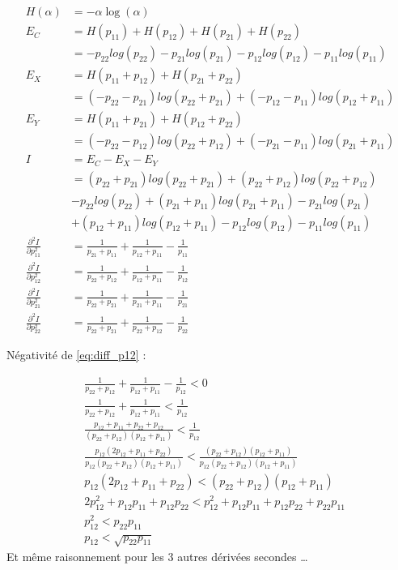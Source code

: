 \documentclass[12pt,a4paper]{article}
\title{}
\date{}
\begin{document}
\begin{align}
    H(\alpha) &= -\alpha \log(\alpha) \\
    E_C &= H(p_{11}) + H(p_{12}) + H(p_{21}) + H(p_{22}) \nonumber\\
    &= -p_{22}log(p_{22})-p_{21}log(p_{21})-p_{12}log(p_{12})-p_{11}log(p_{11})\\
    E_X &= H(p_{11} + p_{12}) + H(p_{21} + p_{22}) \nonumber\\
    &= (-p_{22}-p_{21})log(p_{22}+p_{21})+(-p_{12}-p_{11})log(p_{12}+p_{11}) \\
    E_Y &= H(p_{11} + p_{21}) + H(p_{12} + p_{22})\nonumber\\
    &= (-p_{22}-p_{12})log(p_{22}+p_{12})+(-p_{21}-p_{11})log(p_{21}+p_{11}) \\
    I &= E_C-E_X-E_Y\nonumber\\
    &= (p_{22}+p_{21})log(p_{22}+p_{21})+(p_{22}+p_{12})log(p_{22}+p_{12}) \nonumber\\
    &-p_{22}log(p_{22})+(p_{21}+p_{11})log(p_{21}+p_{11})-p_{21}log(p_{21})\nonumber\\
    &+(p_{12}+p_{11})log(p_{12}+p_{11})-p_{12}log(p_{12})-p_{11}log(p_{11}) \\
    \frac{\partial ^2 I}{ \partial p_{11}^2} &= \frac{1}{p_{21}+p_{11}} + \frac{1}{p_{12}+p_{11}} - \frac{1}{p_{11}} \\
    \frac{\partial ^2 I}{ \partial p_{12}^2} &= \frac{1}{p_{22}+p_{12}} + \frac{1}{p_{12}+p_{11}} - \frac{1}{p_{12}} \label{eq:diff_p12}\\
    \frac{\partial ^2 I}{ \partial p_{21}^2} &= \frac{1}{p_{22}+p_{21}} + \frac{1}{p_{21}+p_{11}} - \frac{1}{p_{21}} \\
    \frac{\partial ^2 I}{ \partial p_{22}^2} &= \frac{1}{p_{22}+p_{21}} + \frac{1}{p_{22}+p_{12}} - \frac{1}{p_{22}}
\end{align}

Négativité de \ref{eq:diff_p12} : 

\begin{align}
    & \frac{1}{p_{22}+p_{12}} + \frac{1}{p_{12}+p_{11}} - \frac{1}{p_{12}} < 0 \\
    & \frac{1}{p_{22}+p_{12}} + \frac{1}{p_{12}+p_{11}} < \frac{1}{p_{12}} \\
    & \frac{p_{12} + p_{11} + p_{22} + p_{12}}{(p_{22} + p_{12})(p_{12}+p_{11})} < \frac{1}{p_{12}} \\
    & \frac{p_{12}(2p_{12} + p_{11} + p_{22})}{p_{12}(p_{22} + p_{12})(p_{12}+p_{11})} < \frac{(p_{22} + p_{12})(p_{12}+p_{11})}{p_{12}(p_{22} + p_{12})(p_{12}+p_{11})} \\
    & p_{12}(2p_{12} + p_{11} + p_{22}) < (p_{22} + p_{12})(p_{12}+p_{11}) \\
    & 2p_{12}^2 + p_{12}p_{11} + p_{12}p_{22} < p_{12}^2 + p_{12}p_{11} + p_{12}p_{22} + p_{22}p_{11} \\
    & p_{12}^2 < p_{22}p_{11} \\
    & p_{12} < \sqrt{p_{22}p_{11}}
\end{align}
Et même raisonnement pour les 3 autres dérivées secondes \dots
\end{document}
